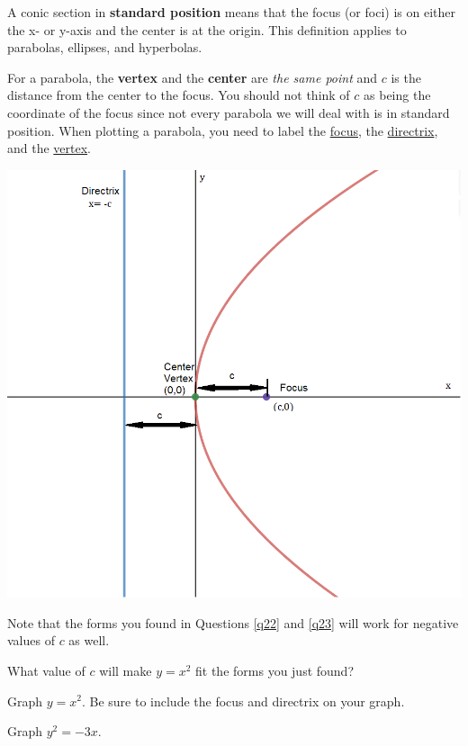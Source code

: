 \begin{info} A conic section in \textbf{standard position} means that the focus (or foci) is on either the x- or y-axis and the center is at the origin. This definition applies to parabolas, ellipses, and hyperbolas.

For a parabola, the \textbf{vertex} and the \textbf{center} are \emph{the same point} and $c$ is the distance from the center to the focus. You should not think of $c$ as being the coordinate of the focus since not every parabola we will deal with is in standard position. When plotting a parabola, you need to label the \underline{focus}, the \underline{directrix}, and the \underline{vertex}.

\begin{center} \includegraphics[scale=.4]{parabolasp3.png} \end{center}

Note that the forms you found in Questions \ref{q22} and \ref{q23} will work for negative values of $c$ as well.
\end{info}

\bq
\be
\item What value of $c$ will make $y=x^2$ fit the forms you just found?
\item Graph $y=x^2$. Be sure to include the focus and directrix on your graph.
\ee
\eq

\question Graph $y^2=-3x$.

